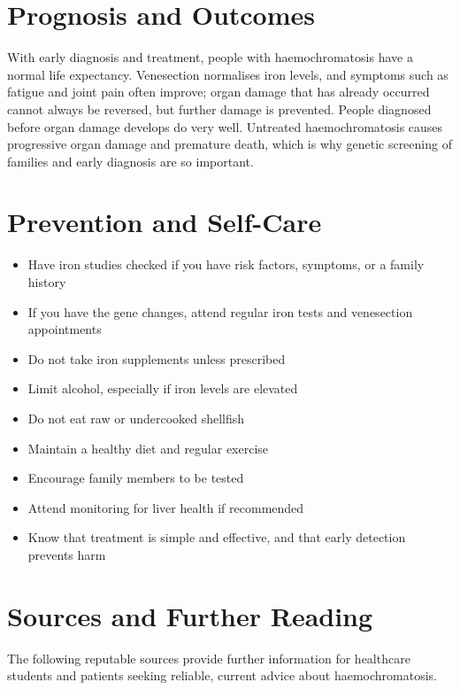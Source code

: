 \section*{Prognosis and Outcomes}
With early diagnosis and treatment, people with haemochromatosis have a normal life expectancy. Venesection normalises iron levels, and symptoms such as fatigue and joint pain often improve; organ damage that has already occurred cannot always be reversed, but further damage is prevented. People diagnosed before organ damage develops do very well. Untreated haemochromatosis causes progressive organ damage and premature death, which is why genetic screening of families and early diagnosis are so important.

\section*{Prevention and Self-Care}
\begin{itemize}
    \item Have iron studies checked if you have risk factors, symptoms, or a family history
    \item If you have the gene changes, attend regular iron tests and venesection appointments
    \item Do not take iron supplements unless prescribed
    \item Limit alcohol, especially if iron levels are elevated
    \item Do not eat raw or undercooked shellfish
    \item Maintain a healthy diet and regular exercise
    \item Encourage family members to be tested
    \item Attend monitoring for liver health if recommended
    \item Know that treatment is simple and effective, and that early detection prevents harm
\end{itemize}

\section*{Sources and Further Reading}
The following reputable sources provide further information for healthcare students and patients seeking reliable, current advice about haemochromatosis.

